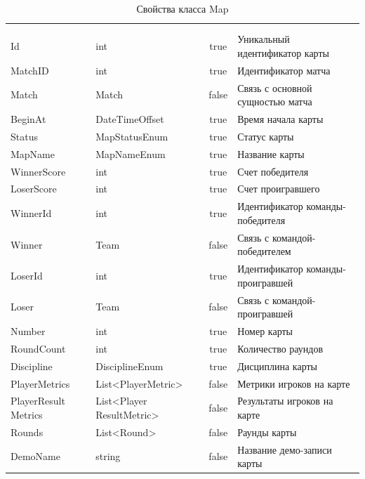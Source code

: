 \begin{xltabular}{\textwidth}{|X|X|c|X|}
	\caption{Свойства класса Map}\label{table:Map}\\ \hline
	 &  &  &  \\ \hline
	 &  &  &  \\ \hline
	\endfirsthead
	 \hline
	 &  &  &  \\ \hline
	\endhead
	Id & int & true & Уникальный идентификатор карты \\ \hline
	MatchID & int & true & Идентификатор матча \\ \hline
	Match & Match & false & Связь с основной сущностью матча \\ \hline
	BeginAt & DateTimeOffset & true & Время начала карты \\ \hline
	Status & MapStatusEnum & true & Статус карты \\ \hline
	MapName & MapNameEnum & true & Название карты \\ \hline
	WinnerScore & int & true & Счет победителя \\ \hline
	LoserScore & int & true & Счет проигравшего \\ \hline
	WinnerId & int & true & Идентификатор команды-победителя \\ \hline
	Winner & Team & false & Связь с командой-победителем \\ \hline
	LoserId & int & true & Идентификатор команды-проигравшей \\ \hline
	Loser & Team & false & Связь с командой-проигравшей \\ \hline
	Number & int & true & Номер карты \\ \hline
	RoundCount & int & true & Количество раундов \\ \hline
	Discipline & DisciplineEnum & true & Дисциплина карты \\ \hline
	PlayerMetrics & List<PlayerMetric> & false & Метрики игроков на карте \\ \hline
	PlayerResult
	Metrics & List<Player
	ResultMetric> & false & Результаты игроков на карте \\ \hline
	Rounds & List<Round> & false & Раунды карты \\ \hline
	DemoName & string & false & Название демо-записи карты \\ \hline
\end{xltabular}

